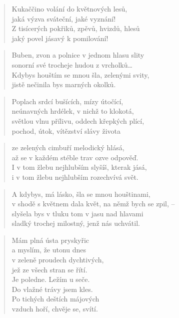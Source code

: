 \documentclass{book}
\begin{document}
\newpage
{}
\begin{verse}
Kukaččino volání do květnových lesů,\\
jaká výzva sváteční, jaké vyznání!\\
Z tisícerých pokřiků, zpěvů, hvizdů, hlesů\\
jaký povel jásavý k pomilování!
\end{verse}
\begin{verse}
Buben, zvon a polnice v jednom hlasu slity\\
sonorní své trocheje hudou z vrcholků\ldots\\
Kdybys houštím se mnou šla, zelenými svity,\\
jistě nečinila bys marných okolků.
\end{verse}
\begin{verse}
Poplach srdcí bušících, mízy útočící,\\
neúnavných hrdélek, v nichž to klokotá,\\
světlou vlnu přílivu, oddech křepkých plící,\\
pochod, útok, vítězství slávy života
\end{verse}
\begin{verse}
ze zelených cimbuří melodický hlásá,\\
až se v každém stéble trav ozve odpověď.\\
I v tom žlebu nejhlubším slyšíš, kterak jásá,\\
i v tom žlebu nejhlubším rozechvívá svět.
\end{verse}
\begin{verse}
A kdybys, má lásko, šla se mnou houštinami,\\
v shodě s květnem dala květ, na němž bych se zpil, --\\
slyšela bys v tluku tom v jasu nad hlavami\\
sladký trochej milostný, jenž nás uchvátil.
\end{verse}
\newpage
{}
\begin{verse}
Mám plná ústa pryskyřic\\
a myslím, že utonu dnes\\
v zeleně proudech dychtivých,\\
jež ze všech stran se řítí.\\
Je poledne. Ležím u seče.\\
Do vlažné trávy jsem kles.\\
Po tichých deštích májových\\
vzduch hoří, chvěje se, svítí.
\end{verse}
\end{document}

